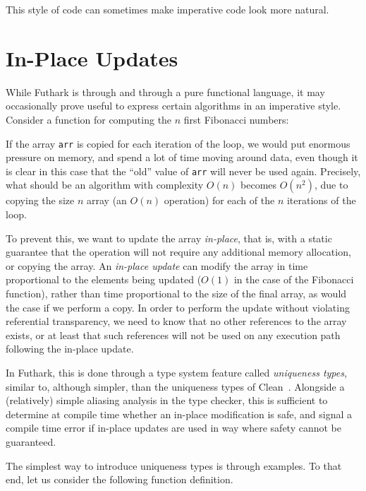 \documentclass[oneside,11pt]{book}
\newenvironment{wrap}{\vspace{\topskip}\par\noindent\begin{minipage}{\linewidth}}{\end{minipage}\par}
\newcommand{\inplisting}[1]{\begin{wrap}\end{wrap}}
\begin{document}
\noindent
This style of code can sometimes make imperative code look more natural.

\section{In-Place Updates}
\label{sec:in-place-updates}

While Futhark is through and through a pure functional language, it
may occasionally prove useful to express certain algorithms in an
imperative style.  Consider a function for computing the $n$ first
Fibonacci numbers:

\inplisting{src/fib_sequential.fut}

If the array \texttt{arr} is copied for each iteration of the loop, we
would put enormous pressure on memory, and spend a lot of time moving
around data, even though it is clear in this case that the ``old''
value of \texttt{arr} will never be used again.  Precisely, what
should be an algorithm with complexity $O(n)$ becomes $O(n^2)$, due to
copying the size $n$ array (an $O(n)$ operation) for each of the $n$
iterations of the loop.

To prevent this, we want to update the array \textit{in-place}, that
is, with a static guarantee that the operation will not require any
additional memory allocation, or copying the array.  An
\textit{in-place update} can modify the array in time proportional to
the elements being updated ($O(1)$ in the case of the Fibonacci
function), rather than time proportional to the size of the final
array, as would the case if we perform a copy.  In order to perform
the update without violating referential transparency, we need to know
that no other references to the array exists, or at least that such
references will not be used on any execution path following the
in-place update.

In Futhark, this is done through a type system feature called
\textit{uniqueness types}, similar to, although simpler, than the
uniqueness types of
Clean~\cite{clean-uniqueness-types,barendsen1996uniqueness}.
Alongside a (relatively) simple aliasing analysis in the type checker,
this is sufficient to determine at compile time whether an in-place
modification is safe, and signal a compile time error if in-place
updates are used in way where safety cannot be guaranteed.

The simplest way to introduce uniqueness types is through examples.
To that end, let us consider the following function definition.
\end{document}
